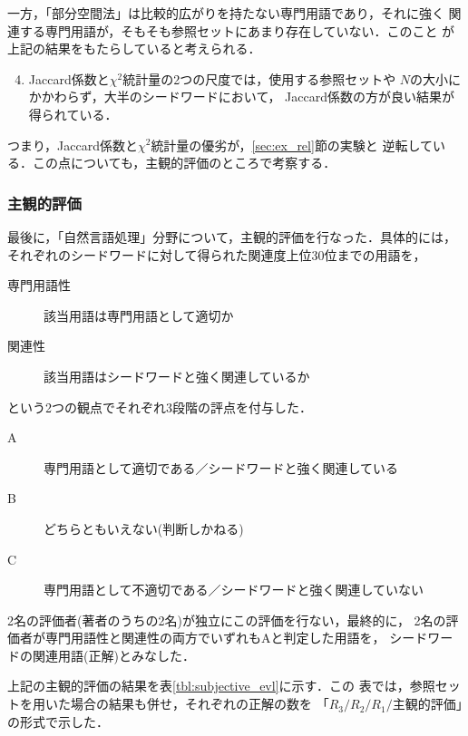 一方，「部分空間法」は比較的広がりを持たない専門用語であり，それに強く
関連する専門用語が，そもそも参照セットにあまり存在していない．このこと
が上記の結果をもたらしていると考えられる．

\begin{enumerate} \setcounter{enumi}{3}
\item 
Jaccard係数と$\chi^2$統計量の2つの尺度では，使用する参照セットや
$N$の大小にかかわらず，大半のシードワードにおいて，
Jaccard係数の方が良い結果が得られている．
\end{enumerate}

つまり，Jaccard係数と$\chi^2$統計量の優劣が，\mbox{\ref{sec:ex_rel}節}の実験と
逆転している．この点についても，主観的評価のところで考察する．

\subsubsection{主観的評価}

最後に，「自然言語処理」分野について，主観的評価を行なった．具体的には，
それぞれのシードワードに対して得られた関連度上位30位までの用語を，
\begin{description}
\item[専門用語性] 該当用語は専門用語として適切か
\item[関連性] 該当用語はシードワードと強く関連しているか
\end{description}
という2つの観点でそれぞれ3段階の評点を付与した．
\begin{description}
 \item[A] 専門用語として適切である／シードワードと強く関連している
 \item[B] どちらともいえない(判断しかねる)
 \item[C] 専門用語として不適切である／シードワードと強く関連していない
\end{description}

2名の評価者(著者のうちの2名)が独立にこの評価を行ない，最終的に，
2名の評価者が専門用語性と関連性の両方でいずれもAと判定した用語を，
シードワードの関連用語(正解)とみなした．

上記の主観的評価の結果を\mbox{表\ref{tbl:subjective_evl}}に示す．この
表では，参照セットを用いた場合の結果も併せ，それぞれの正解の数を
「$R_3/R_2/R_1/\mbox{主観的評価}$」の形式で示した．

